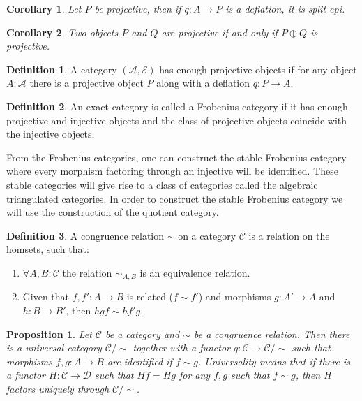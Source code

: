 \documentclass[11pt]{article}
\newtheorem{corollary}{Corollary}[theorem]
\newtheorem{prop}[theorem]{Proposition}
\theoremstyle{definition}
\newtheorem{definition}{Definition}[section]
\theoremstyle{remark}
\begin{document}
            \begin{corollary}
                Let $P$ be projective, then if $q:A\rightarrow P$ is a deflation, it is split-epi.
            \end{corollary}

            \begin{corollary}
                Two objects $P$ and $Q$ are projective if and only if $P\oplus Q$ is projective.
            \end{corollary}

            \begin{definition}
                A category $(\mathcal{A}, \mathcal{E})$ has enough projective objects if for any object $A:\mathcal{A}$ there is a projective object $P$ along with a deflation $q:P\rightarrow A$.
            \end{definition}

            \begin{definition}
                An exact category is called a Frobenius category if it has enough projective and injective objects and the class of projective objects coincide with the injective objects.
            \end{definition}

            From the Frobenius categories, one can construct the stable Frobenius category where every morphism factoring through an injective will be identified. These stable categories will give rise to a class of categories called the algebraic triangulated categories. In order to construct the stable Frobenius category we will use the construction of the quotient category.

            \begin{definition}
                A congruence relation $\sim$ on a category $\mathcal{C}$ is a relation on the homsets, such that:
                \begin{enumerate}
                    \item $\forall A,B:\mathcal{C}$ the relation $\sim_{A,B}$ is an equivalence relation.
                    \item Given that $f,f':A\rightarrow B$ is related ($f\sim f'$) and morphisms $g:A'\rightarrow A$ and $h:B\rightarrow B'$, then $hgf\sim hf'g$.
                \end{enumerate}
            \end{definition}

            \begin{prop}
                Let $\mathcal{C}$ be a category and $\sim$ be a congruence relation. Then there is a universal category $\mathcal{C}/\sim$ together with a functor $q:\mathcal{C}\rightarrow \mathcal{C}/\sim$ such that morphisms $f,g:A\rightarrow B$ are identified if $f\sim g$. Universality means that if there is a functor $H:\mathcal{C}\rightarrow \mathcal{D}$ such that $Hf=Hg$ for any $f,g$ such that $f\sim g$, then H factors uniquely through $\mathcal{C}/\sim$.
            \end{prop}
\end{document}
